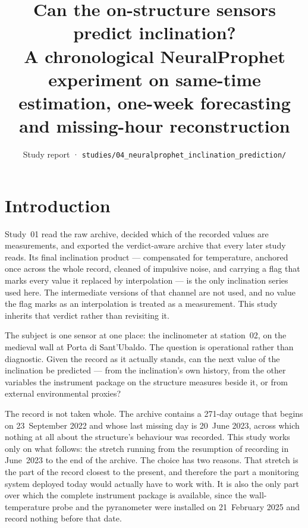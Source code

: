 \documentclass[11pt,a4paper]{article}
\title{\vspace{-1.2cm}\textbf{Can the on-structure sensors predict inclination?}\\[2mm]
\large A chronological NeuralProphet experiment on same-time estimation,
one-week forecasting and missing-hour reconstruction}
\author{Study report · \texttt{studies/04\_neuralprophet\_inclination\_prediction/}}
\date{}
\begin{document}
\maketitle
\thispagestyle{fancy}



\tableofcontents



\section{Introduction}

Study~01 read the raw archive, decided which of the recorded values are
measurements, and exported the verdict-aware archive that every later study
reads. Its final inclination product --- compensated for temperature, anchored
once across the whole record, cleaned of impulsive noise, and carrying a flag
that marks every value it replaced by interpolation --- is the only inclination
series used here. The intermediate versions of that channel are not used, and no
value the flag marks as an interpolation is treated as a measurement. This study
inherits that verdict rather than revisiting it.

The subject is one sensor at one place: the inclinometer at station~02, on the
medieval wall at Porta di Sant'Ubaldo. The question is operational rather than
diagnostic. Given the record as it actually stands, can the next value of the
inclination be predicted --- from the inclination's own history, from the other
variables the instrument package on the structure measures beside it, or from
external environmental proxies?

The record is not taken whole. The archive contains a 271-day outage that begins
on 23~September 2022 and whose last missing day is 20~June 2023, across which
nothing at all about the structure's behaviour was recorded. This study works
only on what follows: the stretch running from the resumption of recording in
June~2023 to the end of the archive. The choice has two reasons. That stretch is
the part of the record closest to the present, and therefore the part a
monitoring system deployed today would actually have to work with. It is also
the only part over which the complete instrument package is available, since the
wall-temperature probe and the pyranometer were installed on 21~February 2025
and record nothing before that date.
\end{document}
